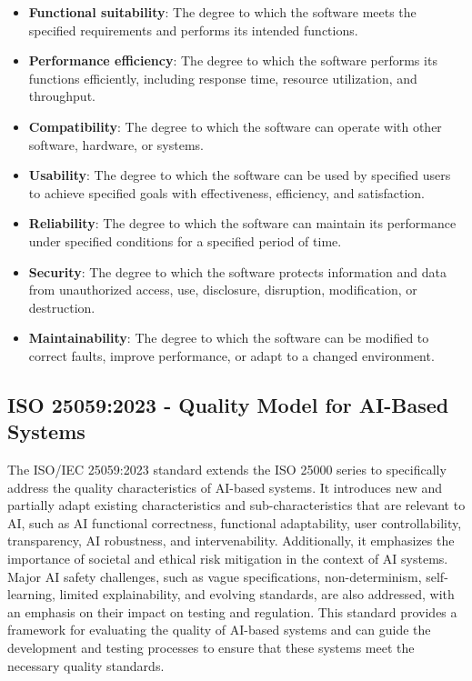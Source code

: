 \documentclass[
  letterpaper,
  DIV=11,
  numbers=noendperiod,
  oneside]{scrreprt}
\begin{document}
\begin{tcolorbox}
\begin{itemize}
\item
  \textbf{Functional suitability}: The degree to which the software
  meets the specified requirements and performs its intended functions.
\item
  \textbf{Performance efficiency}: The degree to which the software
  performs its functions efficiently, including response time, resource
  utilization, and throughput.
\item
  \textbf{Compatibility}: The degree to which the software can operate
  with other software, hardware, or systems.
\item
  \textbf{Usability}: The degree to which the software can be used by
  specified users to achieve specified goals with effectiveness,
  efficiency, and satisfaction.
\item
  \textbf{Reliability}: The degree to which the software can maintain
  its performance under specified conditions for a specified period of
  time.
\item
  \textbf{Security}: The degree to which the software protects
  information and data from unauthorized access, use, disclosure,
  disruption, modification, or destruction.
\item
  \textbf{Maintainability}: The degree to which the software can be
  modified to correct faults, improve performance, or adapt to a changed
  environment.
\end{itemize}

\subsection{ISO 25059:2023 - Quality Model for AI-Based
Systems}\label{iso-250592023---quality-model-for-ai-based-systems}

The ISO/IEC 25059:2023 standard extends the ISO 25000 series to
specifically address the quality characteristics of AI-based systems. It
introduces new and partially adapt existing characteristics and
sub-characteristics that are relevant to AI, such as AI functional
correctness, functional adaptability, user controllability,
transparency, AI robustness, and intervenability. Additionally, it
emphasizes the importance of societal and ethical risk mitigation in the
context of AI systems. Major AI safety challenges, such as vague
specifications, non-determinism, self-learning, limited explainability,
and evolving standards, are also addressed, with an emphasis on their
impact on testing and regulation. This standard provides a framework for
evaluating the quality of AI-based systems and can guide the development
and testing processes to ensure that these systems meet the necessary
quality standards.


\end{tcolorbox}
\end{document}
